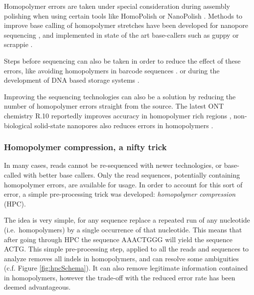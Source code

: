\documentclass[
  11pt,
  twoside]{scrbook}
\begin{document}
Homopolymer errors are taken under special consideration during assembly polishing when using certain tools like HomoPolish \autocite{huangHomopolishMethodRemoval2021} or NanoPolish \autocite{simpsonDetectingDNACytosine2017}. Methods to improve base calling of homopolymer stretches have been developed for nanopore sequencing \autocite{rangSquiggleBasepairComputational2018,sarkozyCallingHomopolymerStretches2018}, and implemented in state of the art base-callers such as guppy or scrappie \autocite{wickPerformanceNeuralNetwork2019}.

Steps before sequencing can also be taken in order to reduce the effect of these errors, like avoiding homopolymers in barcode sequences \autocite{hawkinsIndelcorrectingDNABarcodes2018,srivathsanMinIONBasedPipeline2018}. or during the development of DNA based storage systems \autocite{wangConstructionBioConstrainedCode2019}.

Improving the sequencing technologies can also be a solution by reducing the number of homopolymer errors straight from the source. The latest ONT chemistry R.10 reportedly improves accuracy in homopolymer rich regions \autocite{R10NewestNanopore,amarasingheOpportunitiesChallengesLongread2020}, non-biological solid-state nanopores also reduces errors in homopolymers \autocite{zhouDetectionDNAHomopolymer2019,gotoIdentificationFourSinglestranded2018}.

\hypertarget{hpc-trick}{%
\subsubsection{Homopolymer compression, a nifty trick}\label{hpc-trick}}

In many cases, reads cannot be re-sequenced with newer technologies, or base-called with better base callers. Only the read sequences, potentially containing homopolymer errors, are available for usage. In order to account for this sort of error, a simple pre-processing trick was developed: \emph{homopolymer compression} (HPC).

The idea is very simple, for any sequence replace a repeated run of any nucleotide (i.e.~homopolymers) by a single occurrence of that nucleotide. This means that after going through HPC the sequence AAACTGGG will yield the sequence ACTG. This simple pre-processing step, applied to all the reads and sequences to analyze removes all indels in homopolymers, and can resolve some ambiguities (c.f. Figure \ref{fig:hpcSchema}). It can also remove legitimate information contained in homopolymers, however the trade-off with the reduced error rate has been deemed advantageous.
\end{document}

